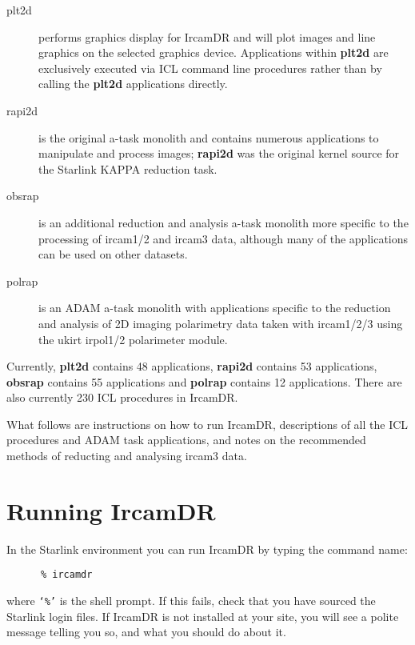 \begin{description}

\item [plt2d] performs graphics display for {\sc IrcamDR} and will plot
images and line graphics on the selected graphics device.  Applications
within {\bf plt2d} are exclusively executed via ICL command line
procedures rather than by calling the {\bf plt2d} applications directly.

\item [rapi2d] is the original a-task monolith and contains numerous
applications to manipulate and process images; {\bf rapi2d} was the
original kernel source for the Starlink KAPPA reduction task.

\item [obsrap] is an additional reduction and analysis a-task monolith
more specific to the processing of {\sc ircam1/2} and {\sc ircam3} data,
although many of the applications can be used on other datasets.

\item [polrap] is an {\sc ADAM} a-task monolith with applications specific
to the reduction and analysis of 2D imaging polarimetry data taken with
{\sc ircam1/2/3} using the {\sc ukirt} {\sc irpol1/2} polarimeter module.

\end{description}

Currently, {\bf plt2d} contains 48 applications, {\bf rapi2d} contains
53 applications, {\bf obsrap} contains 55 applications and {\bf polrap}
contains 12 applications.  There are also currently 230 ICL procedures
in {\sc IrcamDR}.

What follows are instructions on how to run {\sc IrcamDR}, descriptions
of all the ICL procedures and {\sc ADAM} task applications, and notes
on the recommended methods of reducting and analysing {\sc ircam3}
data.

\section{\label{se:running_ircamdr}Running {\sc IrcamDR}}

In the Starlink environment you can run {\sc IrcamDR} by typing the command
name:

\begin{verbatim}
      % ircamdr
\end{verbatim}

where {\tt `\%'} is the shell prompt.  If this fails, check that you have
sourced the Starlink login files.  If {\sc IrcamDR} is not installed
at your site, you will see a polite message telling
you so, and what you should do about it.

